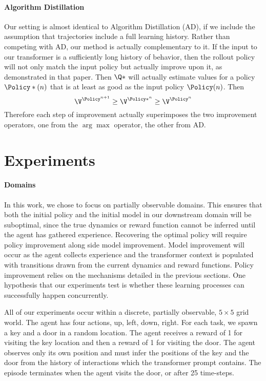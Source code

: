\paragraph{Algorithm Distillation}
Our setting is almost identical to Algorithm Distillation (AD), if we include
the assumption that trajectories include a full learning history. Rather than
competing with AD, our method is actually complementary to it. If the input to our
transformer is a sufficiently long history of behavior, then the rollout policy
will not only match the input policy but actually improve upon it, as
demonstrated in that paper. Then $\Q*$ will actually estimate values for a
policy $\Policy*(n)$ that is at least as good as the input policy $\Policy(n)$.
Then
$$\V^{\Policy^{n+1}} \ge \V^{\Policy*^{n}} \ge \V^{\Policy^{n}}$$
Therefore each step
of improvement actually superimposes the two improvement operators, one from the
$\arg\max$ operator, the other from AD.

\section{Experiments}
\paragraph{Domains}
In this work, we chose to focus on partially observable domains. This ensures
that both the initial policy and the initial model in our downstream domain will
be suboptimal, since the true dynamics or reward function cannot be inferred
until the agent has gathered experience. Recovering the optimal policy will
require policy improvement along side model improvement. Model improvement will
occur as the agent collects experience and the transformer context is populated
with transitions drawn from the current dynamics and reward functions. Policy
improvement relies on the mechanisms detailed in the previous sections. One
hypothesis that our experiments test is whether these learning processes can
successfully happen concurrently.

All of our experiments occur within a discrete, partially observable, $5\times
    5$ grid world. The agent has four actions, up, left, down, right. For each
task, we spawn a key and a door in a random location. The agent receives a
reward of 1 for visiting the key location and then a reward of 1 for
visiting the door. The agent observes only its own position and must infer
the positions of the key and the door from the history of interactions which
the transformer prompt contains. The episode terminates when the agent visits
the door, or after 25 time-steps.


